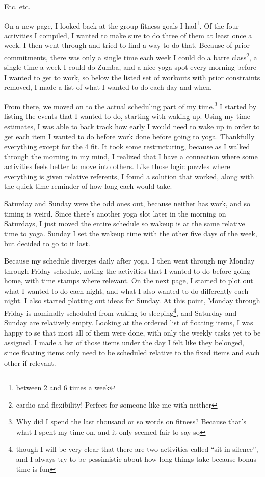 \documentclass[12pt]{article}[titlepage]
\newcommand{\say}[1]{``#1''}
\renewcommand{\,}{\textsuperscript{,}}
\begin{document}
Etc. etc.

On a new page, I looked back at the group fitness goals I had\footnote{between 2 and 6 times a week}.  
Of the four activities I compiled, I wanted to make sure to do three of them at least once a week.  
I then went through and tried to find a way to do that.  
Because of prior commitments, there was only a single time each week I could do a barre class\footnote{cardio and flexibility! Perfect for someone like me with neither}, a single time a week I could do Zumba, and a nice yoga spot every morning before I wanted to get to work, so below the listed set of workouts with prior constraints removed, I made a list of what I wanted to do each day and when.

From there, we moved on to the actual scheduling part of my time.\footnote{Why did I spend the last thousand or so words on fitness? Because that's what I spent my time on, and it only seemed fair to say so}  
I started by listing the events that I wanted to do, starting with waking up.  
Using my time estimates, I was able to back track how early I would need to wake up in order to get each item I wanted to do before work done before going to yoga.  
Thankfully everything except for the 4 fit.  
It took some restructuring, because as I walked through the morning in my mind, I realized that I have a connection where some activities feels better to move into others.  
Like those logic puzzles where everything is given relative referents, I found a solution that worked, along with the quick time reminder of how long each would take.

Saturday and Sunday were the odd ones out, because neither has work, and so timing is weird.  
Since there's another yoga slot later in the morning on Saturdays, I just moved the entire schedule so wakeup is at the same relative time to yoga.  
Sunday I set the wakeup time with the other five days of the week, but decided to go to it last.

Because my schedule diverges daily after yoga, I then went through my Monday through Friday schedule, noting the activities that I wanted to do before going home, with time stamps where relevant.  
On the next page, I started to plot out what I wanted to do each night, and what I also wanted to do differently each night.  
I also started plotting out ideas for Sunday.  
At this point, Monday through Friday is nominally scheduled from waking to sleeping\footnote{though I will be very clear that there are two activities called \say{sit in silence}, and I always try to be pessimistic about how long things take because bonus time is fun}, and Saturday and Sunday are relatively empty.  
Looking at the ordered list of floating items, I was happy to se that most all of them were done, with only the weekly tasks yet to be assigned.  
I made a list of those items under the day I felt like they belonged, since floating items only need to be scheduled relative to the fixed items and each other if relevant.
\end{document}
